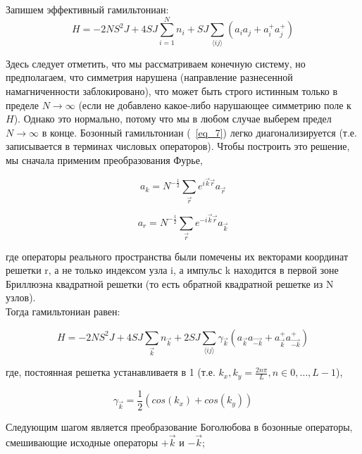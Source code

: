 \documentclass[11pt]{article}
\begin{document}
Запишем эффективный гамильтониан:
\begin{equation}
H = -2NS^2J+4SJ\sum\limits_{i=1}^Nn_i+SJ\sum\limits_{\langle ij \rangle} (a_ia_j+a_i^{+}a_j^{+})
\label{eq_7}
\end{equation}

Здесь следует отметить, что мы рассматриваем конечную систему, но предполагаем, что симметрия нарушена (направление разнесенной намагниченности заблокировано), что может быть строго истинным только в пределе $N \to \infty$ (если не добавлено какое-либо нарушающее симметрию поле к $H$). Однако это нормально, потому что мы в любом случае выберем предел $N \to \infty$ в конце.
Бозонный гамильтониан (~\ref{eq_7}) легко диагонализируется (т.е. записывается в терминах числовых операторов). Чтобы построить это решение, мы сначала применим преобразования Фурье,

\begin{equation}
a_k = N^{-\frac{1}{2}}\sum\limits_{\vec{r}}e^{i\vec{k}\vec{r}}a_{\vec{r}}
\label{eq_8}
\end{equation}

\begin{equation*}
a_r = N^{-\frac{1}{2}}\sum\limits_{\vec{r}}e^{-i\vec{k}\vec{r}}a_{\vec{k}}
\label{eq_8}
\end{equation*}

где операторы реального пространства были помечены их векторами координат решетки r, а не только индексом узла i, а импульс k находится в первой зоне Бриллюэна квадратной решетки (то есть обратной квадратной решетке из N узлов). \\

Тогда гамильтониан равен:

\begin{equation}
H = -2NS^2J+4SJ\sum\limits_{\vec{k}} n_{\vec{k}}+2SJ\sum\limits_{\langle ij \rangle} \gamma_{\vec{k}}(a_{\vec{k}}a_{\vec{-k}}+a_{\vec{k}}^{+}a_{\vec{-k}}^{+})
\label{eq_9}
\end{equation}

где, постоянная решетка устанавливаетя в 1 (т.е. $k_x,k_y=\frac{2n\pi}{L}, n \in {0,\dots,L-1}$),

\begin{equation}
\gamma_{\vec{k}} = \frac{1}{2}(cos(k_x)+cos(k_y))
\label{eq_10}
\end{equation}

Следующим шагом является преобразование Боголюбова в бозонные операторы, смешивающие исходные операторы $+\vec{k}$ и $−\vec{k}$;
\end{document}
